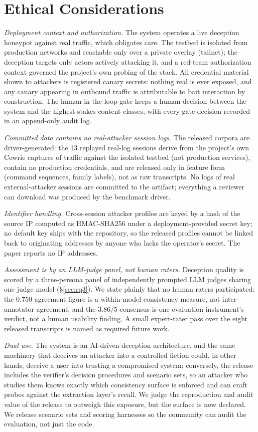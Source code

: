 \section{Ethical Considerations}
\label{sec:ethics}

\emph{Deployment context and authorization.} The system operates a live
deception honeypot against real traffic, which obligates care. The
testbed is isolated from production networks and reachable only over a
private overlay (tailnet); the deception targets only actors actively
attacking it, and a red-team authorization context governed the project's
own probing of the stack. All credential material shown to attackers is
registered canary secrets: nothing real is ever exposed, and any canary
appearing in outbound traffic is attributable to bait interaction by
construction. The human-in-the-loop gate keeps a human decision between
the system and the highest-stakes content classes, with every gate
decision recorded in an append-only audit log.

\emph{Committed data contains no real-attacker session logs.} The released
corpora are driver-generated: the 13 replayed real-log sessions derive
from the project's own Cowrie captures of traffic against the isolated
testbed (not production services), contain no production credentials, and
are released only in feature form (command sequences, family labels), not
as raw transcripts. No logs of real external-attacker sessions are
committed to the artifact; everything a reviewer can download was produced
by the benchmark driver.

\emph{Identifier handling.} Cross-session attacker profiles are keyed by
a hash of the source IP computed as HMAC-SHA256 under a deployment-provided
secret key; no default key ships with the repository, so the released
profiles cannot be linked back to originating addresses by anyone who
lacks the operator's secret. The paper reports no IP addresses.

\emph{Assessment is by an LLM-judge panel, not human raters.} Deception
quality is scored by a three-persona panel of independently prompted LLM
judges sharing one judge model (\S\ref{sec:rq3}). We state plainly that
no human raters participated: the $0.750$ agreement figure is a
within-model consistency measure, not inter-annotator agreement, and the
$3.86/5$ consensus is one evaluation instrument's verdict, not a human
usability finding. A small expert-rater pass over the eight released
transcripts is named as required future work.

\emph{Dual use.} The system is an AI-driven deception architecture, and
the same machinery that deceives an attacker into a controlled fiction
could, in other hands, deceive a user into trusting a compromised system;
conversely, the release includes the verifier's decision procedures and
scenario sets, so an attacker who studies them knows exactly which
consistency surface is enforced and can craft probes against the
extraction layer's recall. We judge the reproduction and audit value of
the release to outweigh this exposure, but the surface is now declared.
We release scenario sets and scoring harnesses so the community can audit
the evaluation, not just the code.

